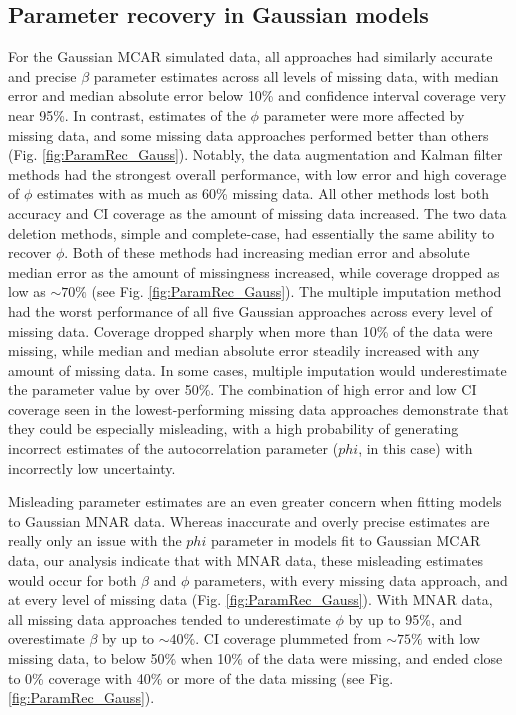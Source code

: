 \documentclass{article}
\begin{document}
\subsection*{Parameter recovery in Gaussian models}
For the Gaussian MCAR simulated data, all approaches had similarly accurate and precise $\beta$ parameter estimates across all levels of missing data, with median error and median absolute error below 10\% and confidence interval coverage very near 95\%. In contrast, estimates of the $\phi$ parameter were more affected by missing data, and some missing data approaches performed better than others (Fig. \ref{fig:ParamRec_Gauss}). Notably, the data augmentation and Kalman filter methods had the strongest overall performance, with low error and high coverage of $\phi$ estimates with as much as 60\% missing data. All other methods lost both accuracy and CI coverage as the amount of missing data increased. The two data deletion methods, simple and complete-case, had essentially the same ability to recover $\phi$. Both of these methods had increasing median error and absolute median error as the amount of missingness increased, while coverage dropped as low as $\sim70\%$ (see Fig. \ref{fig:ParamRec_Gauss}). The multiple imputation method had the worst performance of all five Gaussian approaches across every level of missing data. Coverage dropped sharply when more than 10\% of the data were missing, while median and median absolute error steadily increased with any amount of missing data. In some cases, multiple imputation would underestimate the parameter value by over 50\%. The combination of high error and low CI coverage seen in the lowest-performing missing data approaches demonstrate that they could be especially misleading, with a high probability of generating incorrect estimates of the autocorrelation parameter ($phi$, in this case) with incorrectly low  uncertainty. 

Misleading parameter estimates are an even greater concern when fitting models to Gaussian MNAR data.  Whereas inaccurate and overly precise estimates are really only an issue with the $phi$ parameter in models fit to Gaussian MCAR data, our analysis indicate that with MNAR data, these misleading estimates would occur for both $\beta$ and $\phi$ parameters, with every missing data approach, and at every level of missing data (Fig. \ref{fig:ParamRec_Gauss}). With MNAR data, all missing data approaches tended to underestimate $\phi$ by up to 95\%, and overestimate $\beta$ by up to $\sim40\%$.  CI coverage plummeted from $\sim75\%$ with low missing data, to below 50\% when 10\% of the data were missing, and ended close to 0\% coverage with 40\% or more of the data missing (see Fig. \ref{fig:ParamRec_Gauss}). 
\end{document}

